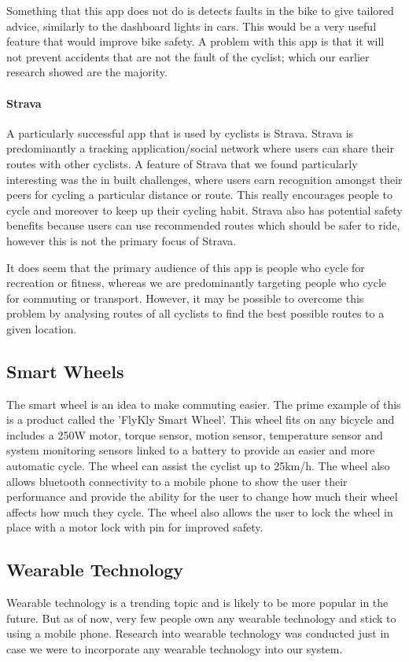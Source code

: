 \documentclass[a4paper]{report}
\begin{document}
{Something that this app does not do is detects faults in the bike to give tailored advice, similarly to the dashboard lights in cars. This would be a very useful feature that would improve bike safety. A problem with this app is that it will not prevent accidents that are not the fault of the cyclist; which our earlier research showed are the majority.

\paragraph{Strava} A particularly successful app that is used by cyclists is Strava\cite{strava}. Strava is predominantly a tracking application/social network where users can share their routes with other cyclists. A feature of Strava that we found particularly interesting was the in built challenges, where users earn recognition amongst their peers for cycling a particular distance or route. This really encourages people to cycle and moreover to keep up their cycling habit. Strava also has potential safety benefits because users can use recommended routes which should be safer to ride, however this is not the primary focus of Strava.

It does seem that the primary audience of this app is people who cycle for recreation or fitness, whereas we are predominantly targeting people who cycle for commuting or transport. However, it may be possible to overcome this problem by analysing routes of all cyclists to find the best possible routes to a given location.

\subsection{Smart Wheels}
The smart wheel is an idea to make commuting easier. The prime example of this is a product called the 'FlyKly Smart Wheel'\citep{flykly}. This wheel fits on any bicycle and includes a 250W motor,  torque sensor, motion sensor, temperature sensor and system monitoring sensors linked to a battery to provide an easier and more automatic cycle. The wheel can assist the cyclist up to 25km/h. The wheel also allows bluetooth connectivity to a mobile phone to show the user their performance and provide the ability for the user to change how much their wheel affects how much they cycle. The wheel also allows the user to lock the wheel in place with a motor lock with pin for improved safety.

\subsection{Wearable Technology}
Wearable technology is a trending topic and is likely to be more popular in the future. But as of now, very few people own any wearable technology and stick to using a mobile phone. Research into wearable technology was conducted just in case we were to incorporate any wearable technology into our system. 

}
\end{document}

